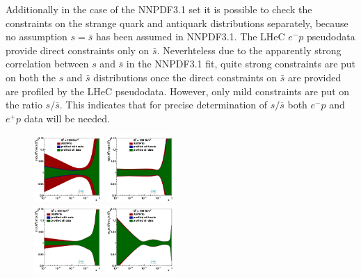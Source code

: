 \documentclass[pdftex,twocolumn,epjc3]{svjour3}          %
\newcommand\new[1]{{\color{blue} #1}}
\begin{document}
\new{
Additionally in the case of the NNPDF3.1 set it is possible to check 
the constraints on the strange quark and antiquark distributions 
separately, because no assumption $s=\bar{s}$ has been assumed in NNPDF3.1. 
The LHeC $e^{-}p$ pseudodata provide direct constraints only on $\bar{s}$. 
Neverhteless due to the apparently strong correlation between $s$ and 
$\bar{s}$ in the NNPDF3.1 fit, quite strong constraints are put on both 
the $s$ and $\bar{s}$ distributions once the direct constraints on $\bar{s}$ 
are provided are profiled by the LHeC pseudodata. However, only mild constraints 
are put on the ratio $s/\overline{s}$. This indicates that for precise 
determination of $s/\overline{s}$ both $e^{-}p$ and $e^{+}p$ data will be needed.

\begin{figure}
  \centering
  {{\includegraphics[width=0.235\textwidth]{pics/pdf-profile-ffabm/q2_100_pdf_sq_ratio.pdf}}}
  {{\includegraphics[width=0.235\textwidth]{pics/pdf-profile-ffabm/q2_100_pdf_g_ratio.pdf}}}\\
  {{\includegraphics[width=0.235\textwidth]{pics/pdf-profile-ffabm/q2_100_pdf_Sea_ratio.pdf}}}
  {{\includegraphics[width=0.235\textwidth]{pics/pdf-profile-ffabm/q2_100_pdf_uv_ratio.pdf}}}

\end{figure}}
\end{document}
